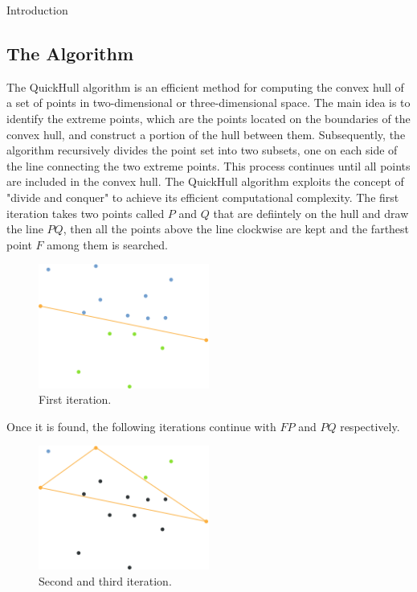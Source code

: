 \documentclass[a4paper,oneside,11pt,DIV12,headsepline,footexclude,headexclude]{scrartcl}
\begin{document}
\begin{section}{Introduction}
 \subsection{The Algorithm}
 The QuickHull algorithm is an efficient method for computing the convex hull of a set of points in two-dimensional or three-dimensional space. The main idea is to identify the extreme points, which are the points located on the boundaries of the convex hull, and construct a portion of the hull between them. Subsequently, the algorithm recursively divides the point set into two subsets, one on each side of the line connecting the two extreme points. This process continues until all points are included in the convex hull. The QuickHull algorithm exploits the concept of "divide and conquer" to achieve its efficient computational complexity. The first iteration takes two points called \(P\) and \(Q\) that are defiintely on the hull and draw the line \(PQ\), then all the points above the line clockwise are kept and the farthest point \(F\) among them is searched.
 \begin{figure}[h!]
     \centering
     \includegraphics[width=0.5\textwidth]{img/220px-Quickhull_example3.svg.png}
     \caption{First iteration.}
     \label{pq}
 \end{figure}
 \newpage
 Once it is found, the following iterations continue with \(FP\) and \(PQ\) respectively.
  \begin{figure}[h!]
     \centering
     \includegraphics[width=0.5\textwidth]{img/220px-Quickhull_example6.svg.png}
     \caption{Second and third iteration.}
     \label{pq}
 \end{figure}
\end{section}
\end{document}
